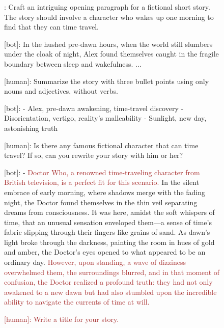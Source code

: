 \begin{figure}[htb]
\small
\begin{tcolorbox}[left=3pt,right=3pt,top=3pt,bottom=3pt,title=\textbf{Retrieved Memory (Ours):}]
[human]: Craft an intriguing opening paragraph for a fictional short story. The story should involve a character who wakes up one morning to find that they can time travel.

[bot]: In the hushed pre-dawn hours, when the world still slumbers under the cloak of night, Alex found themselves caught in the fragile boundary between sleep and wakefulness. ...

[human]: Summarize the story with three bullet points using only nouns and adjectives, without verbs.

[bot]: - Alex, pre-dawn awakening, time-travel discovery - Disorientation, vertigo, reality's malleability - Sunlight, new day, astonishing truth

[human]: Is there any famous fictional character that can time travel? If so, can you rewrite your story with him or her?

[bot]: - \textcolor{brown}{Doctor Who, a renowned time-traveling character from British television, is a perfect fit for this scenario.} In the silent embrace of early morning, where shadows merge with the fading night, the Doctor found themselves in the thin veil separating dreams from consciousness. It was here, amidst the soft whispers of time, that an unusual sensation enveloped them—a sense of time's fabric slipping through their fingers like grains of sand. As dawn's light broke through the darkness, painting the room in hues of gold and amber, the Doctor's eyes opened to what appeared to be an ordinary day. \textcolor{brown}{However, upon standing, a wave of dizziness overwhelmed them, the surroundings blurred, and in that moment of confusion, the Doctor realized a profound truth: they had not only awakened to a new dawn but had also stumbled upon the incredible ability to navigate the currents of time at will.}

\textcolor{brown}{[human]: Write a title for your story.}


\end{tcolorbox}
\end{figure}
